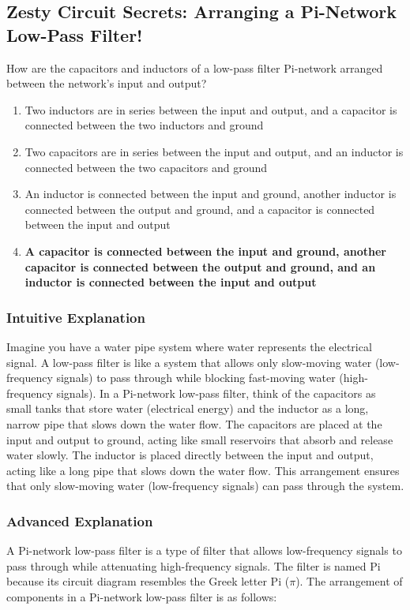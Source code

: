 \subsection{Zesty Circuit Secrets: Arranging a Pi-Network Low-Pass Filter!}

\begin{tcolorbox}[colback=gray!10!white,colframe=black!75!black,title=E7C01] How are the capacitors and inductors of a low-pass filter Pi-network arranged between the network’s input and output?
    \begin{enumerate}[label=\Alph*]
        \item Two inductors are in series between the input and output, and a capacitor is connected between the two inductors and ground
        \item Two capacitors are in series between the input and output, and an inductor is connected between the two capacitors and ground
        \item An inductor is connected between the input and ground, another inductor is connected between the output and ground, and a capacitor is connected between the input and output
        \item \textbf{A capacitor is connected between the input and ground, another capacitor is connected between the output and ground, and an inductor is connected between the input and output}
    \end{enumerate}
\end{tcolorbox}

\subsubsection{Intuitive Explanation}
Imagine you have a water pipe system where water represents the electrical signal. A low-pass filter is like a system that allows only slow-moving water (low-frequency signals) to pass through while blocking fast-moving water (high-frequency signals). In a Pi-network low-pass filter, think of the capacitors as small tanks that store water (electrical energy) and the inductor as a long, narrow pipe that slows down the water flow. The capacitors are placed at the input and output to ground, acting like small reservoirs that absorb and release water slowly. The inductor is placed directly between the input and output, acting like a long pipe that slows down the water flow. This arrangement ensures that only slow-moving water (low-frequency signals) can pass through the system.

\subsubsection{Advanced Explanation}
A Pi-network low-pass filter is a type of filter that allows low-frequency signals to pass through while attenuating high-frequency signals. The filter is named Pi because its circuit diagram resembles the Greek letter Pi ($\pi$). The arrangement of components in a Pi-network low-pass filter is as follows:

